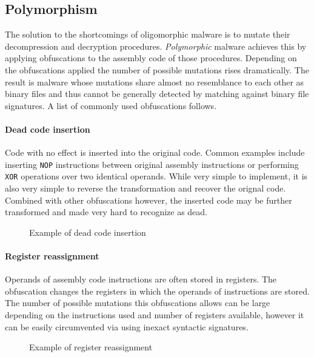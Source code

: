 \subsection{Polymorphism}
The solution to the shortcomings of oligomorphic malware is to mutate their decompression and decryption procedures. \emph{Polymorphic} malware achieves this by applying obfuscations to the assembly code of those procedures. Depending on the obfuscations applied the number of possible mutations rises dramatically. The result is malware whose mutations share almost no resemblance to each other as binary files and thus cannot be generally detected by matching against binary file signatures. A list of commonly used obfuscations follows.

\paragraph*{Dead code insertion}
Code with no effect is inserted into the original code. Common examples include inserting \texttt{NOP} instructions between original assembly instructions or performing \texttt{XOR} operations over two identical operands. While very simple to implement, it is also very simple to reverse the transformation and recover the orignal code. Combined with other obfuscations however, the inserted code may be further transformed and made very hard to recognize as dead.

\begin{figure}[H]
    \centering
    \caption{Example of dead code insertion}
    \label{fig_comp}
\end{figure}

\paragraph*{Register reassignment}
Operands of assembly code instructions are often stored in registers. The obfuscation changes the registers in which the operands of instructions are stored. The number of possible mutations this obfuscations allows can be large depending on the instructions used and number of registers available, however it can be easily circumvented via using inexact syntactic signatures.

\begin{figure}[H]
    \centering
    \caption{Example of register reassignment}
    \label{fig_comp}
\end{figure}


